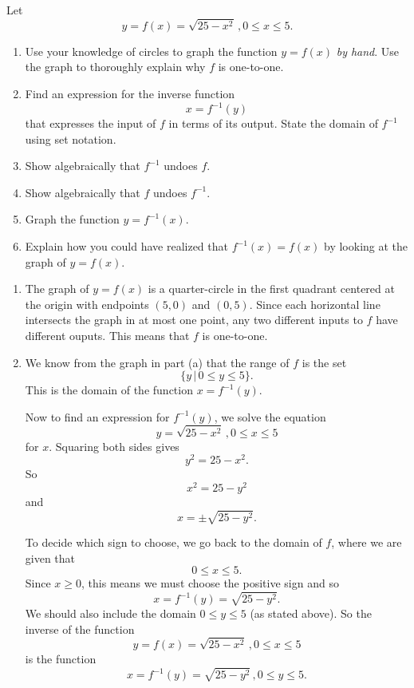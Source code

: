 \documentclass{ximera}
\begin{document}
\begin{example} \label{Ex98:5Quadratics}
Let 
\[
    y=   f(x) = \sqrt{25-x^2} \, , 0\leq x \leq 5 .
\]
\begin{enumerate}
\item Use your knowledge of circles to graph the function $y=f(x)$ \emph{by hand}. Use the graph to thoroughly explain why $f$ is one-to-one.

\item Find an expression for the inverse function
\[
    x = f^{-1}(y)
\]
that expresses the input of $f$ in terms of its output. State the domain of $f^{-1}$ using set notation.

\item Show algebraically that $f^{-1}$ undoes $f$.

\item Show algebraically that $f$ undoes $f^{-1}$.

\item Graph the function $y=f^{-1}(x)$. 

\item Explain how you could have realized that $f^{-1}(x) = f(x)$ by looking at the graph of $y=f(x)$.
\end{enumerate}


\begin{explanation}
\begin{enumerate}
\item The graph of $y=f(x)$ is a quarter-circle in the first quadrant centered at the origin with endpoints $(5,0)$ and $(0,5)$. Since each horizontal line intersects the graph in at most one point, any two different inputs to $f$ have different ouputs. This means that $f$ is one-to-one.

\item We know from the graph in part (a) that the range of $f$ is the set
\[
   \{ y \, | \,  0\leq y \leq 5 \} .
\]
This is the domain of the function $x=f^{-1}(y)$.

Now to find an expression for $f^{-1}(y)$, we solve the equation
\[
   y=   \sqrt{25-x^2} \, , 0\leq x \leq 5 
\]
for $x$. Squaring both sides gives
\[
   y^2 = 25 - x^2 .
\]
So 
\[
     x^2 = 25-y^2
\]
and 
\[
   x  = \pm \sqrt{25-y^2} .
\]

To decide which sign to choose, we go back to the domain of $f$, where we are given that 
\[
     0 \leq x \leq 5 .
\]
Since $x\geq 0$, this means we must choose the positive sign and so
\[
    x = f^{-1}(y) = \sqrt{25-y^2}.
\]
We should also include the domain $0\leq y \leq 5$ (as stated above). So the inverse of the function
\[
    y=   f(x) = \sqrt{25-x^2} \, , 0\leq x \leq 5 
\]
is the function
\[
    x = f^{-1}(y) = \sqrt{25-y^2} \, , 0\leq y \leq 5 .
\]


\end{enumerate}
\end{explanation}
\end{example}
\end{document}
